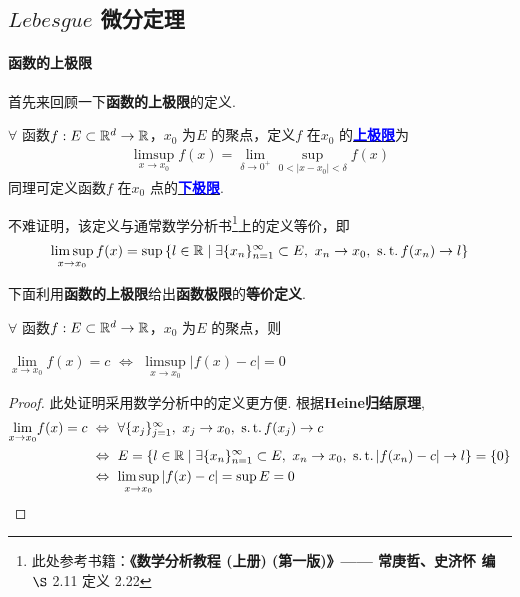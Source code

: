 \newpage
\subsection{$Lebesgue$ 微分定理}
\paragraph{函数的上极限}
	首先来回顾一下\textbf{函数的上极限}的定义.
	\begin{defn}\label{def 4.3.4}
		$\forall$ 函数$f : E \subset \mathbb{R}^d \rightarrow \mathbb{R}$，$x_0$ 为$E$ 的聚点，定义$f$ 在$x_0$ 的\underline{\textcolor{blue}{\textbf{上极限}}}为
		\begin{align}
			\limsup_{x \to x_0}{f(x)} = \lim_{\delta \to 0^{+}}{\sup_{0 < \left| x - x_0 \right| < \delta}{f(x)}}
		\end{align}
		同理可定义函数$f$ 在$x_0$ 点的\underline{\textcolor{blue}{\textbf{下极限}}}.
		\vspace{1em}
		\begin{rmk}
			不难证明，该定义与通常数学分析书\footnote{此处参考书籍：\textbf{《数学分析教程 (上册) (第一版)》—— 常庚哲、史济怀 编} $\S$ 2.11 定义 2.22}上的定义等价，即
			\begin{align}
				\limsup_{x \to x_0}{f(x)} 
				= \sup{\left\{ l \in \mathbb{R}\mid \exists \{ x_n \}_{n = 1}^{\infty} \subset E , \,\, x_n \to x_0 , \,\, \operatorname{s.t.}f(x_n) \to l \right\}}
			\end{align}
		\end{rmk}
	\end{defn}

	\vspace{6em}
	下面利用\textbf{函数的上极限}给出\textbf{函数极限}的\textbf{等价定义}.
	\begin{proposition}\label{prop 4.3.4}
		$\forall$ 函数$f : E \subset \mathbb{R}^d \rightarrow \mathbb{R}$，$x_0$ 为$E$ 的聚点，则
		\begin{center}
			$\underset{x \to x_0}{\lim}{f(x)} = c \,\, \Leftrightarrow \,\, \underset{x \to x_0}{\limsup}{\left| f(x) - c \right|} = 0$
		\end{center}
	
		\vspace{4em}
		\begin{proof}
			此处证明采用数学分析中的定义更方便. 根据\textbf{Heine归结原理},
			\begin{align}
				\underset{x \to x_0}{\lim}{f(x)} = c \,\, 
				&\Leftrightarrow \,\, \forall \{ x_j \}_{j = 1}^{\infty}, \,\, x_j \to x_0, \,\, \operatorname{s.t.} f(x_j) \to c \\
				&\Leftrightarrow \,\, E = \left\{ l \in \mathbb{R} \mid \exists \{ x_n \}_{n = 1}^{\infty} \subset E , \,\, x_n \to x_0 , \,\, \operatorname{s.t.} \left| f(x_n) - c \right| \to l \right\} = \{ 0 \} \\
				&\Leftrightarrow \,\, \limsup_{x \to x_0}{\left| f(x) - c \right|} = \sup{E} = 0
			\end{align}
		\end{proof}
	\end{proposition}

